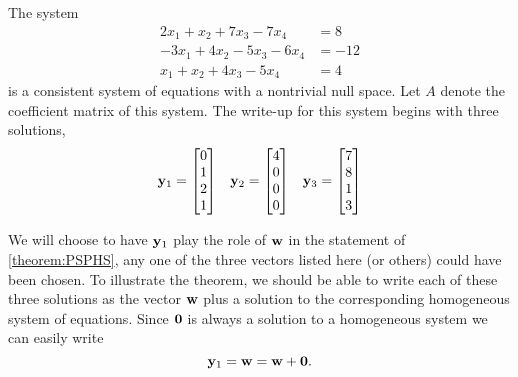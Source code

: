 \documentclass{ximera}
\begin{document}
\begin{example}
  The system
  \begin{align*}
    2x_1  + x_2 + 7x_3 - 7x_4 &= 8 \\
    -3x_1 + 4x_2 -5x_3 - 6x_4 &=  -12 \\
    x_1 +x_2 + 4x_3 - 5x_4 &=  4
  \end{align*}
  is a consistent system of equations with a nontrivial null space.
  Let $A$ denote the coefficient matrix of this system.  The write-up
  for this system begins with three solutions,
  \begin{align*}
    \mathbf{y}_1=\begin{bmatrix}0\\1\\2\\1\end{bmatrix}&&
    \mathbf{y}_2=\begin{bmatrix}4\\0\\0\\0\end{bmatrix}&&
    \mathbf{y}_3=\begin{bmatrix}7\\8\\1\\3\end{bmatrix}
  \end{align*}

  We will choose to have $\mathbf{y}_1$ play the role of $\mathbf{w}$ in
  the statement of \ref{theorem:PSPHS}, any one of the three vectors
  listed here (or others) could have been chosen.  To illustrate the
  theorem, we should be able to write each of these three solutions as
  the vector $\mathbf{w}$ plus a solution to the corresponding
  homogeneous system of equations.  Since $\mathbf{0}$ is always a
  solution to a homogeneous system we can easily write
  \[
    \mathbf{y}_1=\mathbf{w}=\mathbf{w}+\mathbf{0}.
  \]


\end{example}
\end{document}
